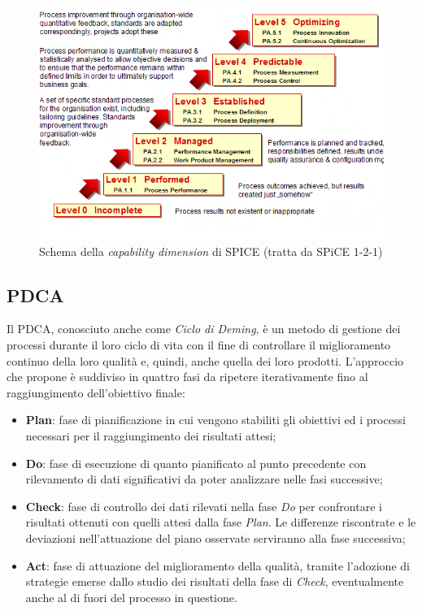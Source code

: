 \begin{figure}[httb]
\centering
\includegraphics[scale=0.8]{./img/SPICE_capability_dimension.png}
\caption[Schema della capability dimension di SPICE]{Schema della \textit{capability dimension} di SPICE (tratta da SPiCE 1-2-1)}
\end{figure}
\newpage

\subsection{PDCA}
Il PDCA, conosciuto anche come \textit{Ciclo di Deming}, è un metodo di gestione dei processi durante il loro ciclo di vita con il fine di controllare il miglioramento continuo della loro qualità e, quindi, anche quella dei loro prodotti.
L'approccio che propone è suddiviso in quattro fasi da ripetere iterativamente fino al raggiungimento dell'obiettivo finale:
\begin{itemize}
\item \textbf{Plan}: fase di pianificazione in cui vengono stabiliti gli obiettivi ed i processi necessari per il raggiungimento dei risultati attesi;
\item \textbf{Do}: fase di esecuzione di quanto pianificato al punto precedente con rilevamento di dati significativi da poter analizzare nelle fasi successive;
\item \textbf{Check}: fase di controllo dei dati rilevati nella fase \textit{Do} per confrontare i risultati ottenuti con quelli attesi dalla fase \textit{Plan}. Le differenze riscontrate e le deviazioni nell'attuazione del piano osservate serviranno alla fase successiva;
\item \textbf{Act}: fase di attuazione del miglioramento della qualità, tramite l'adozione di strategie emerse dallo studio dei risultati della fase di \textit{Check}, eventualmente anche al di fuori del processo in questione.
\end{itemize}

